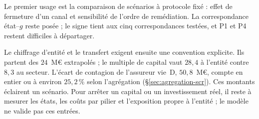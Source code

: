 Le premier usage est la comparaison de scénarios à protocole fixé : effet de fermeture d'un
canal et sensibilité de l'ordre de remédiation. La correspondance état--$g$ reste posée ; le signe
tient aux cinq correspondances testées, et P1 et P4 restent difficiles à départager.

Le chiffrage d'entité et le transfert exigent ensuite une convention explicite. Ils partent des
$24$~M\euro{} extrapolés ; le multiple de capital vaut $28{,}4$ à l'entité contre $8{,}3$ au secteur.
L'écart de contagion de l'assureur vie~D, $50{,}8$~M\euro, compte en entier ou à environ
$25{,}2\,\%$ selon l'agrégation (\S\ref{sec:agregation-scr}). Ces montants éclairent un scénario.
Pour arrêter un capital ou un investissement réel, il reste à mesurer les états, les coûts par
pilier et l'exposition propre à l'entité ; le modèle ne valide pas ces entrées.
